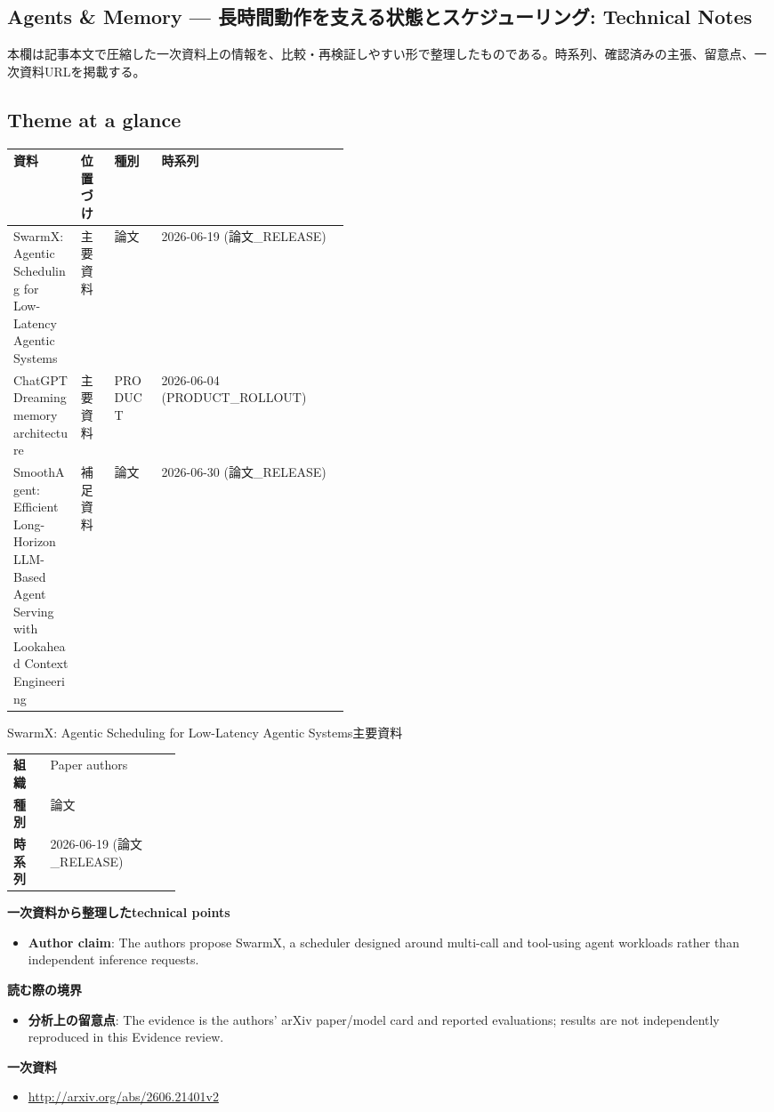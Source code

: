 \subsection*{Agents \& Memory — 長時間動作を支える状態とスケジューリング: Technical Notes}
本欄は記事本文で圧縮した一次資料上の情報を、比較・再検証しやすい形で整理したものである。時系列、確認済みの主張、留意点、一次資料URLを掲載する。
\medskip
\subsection*{Theme at a glance}
\begin{center}
\footnotesize
\begin{tabularx}{\linewidth}{@{}p{0.20\linewidth}p{0.10\linewidth}p{0.14\linewidth}X@{}}
\toprule
資料 & 位置づけ & 種別 & 時系列 \\
\midrule
SwarmX: Agentic Scheduling for Low-Latency Agentic Systems & 主要資料 & 論文 & 2026-06-19 (論文\_RELEASE) \\
ChatGPT Dreaming memory architecture & 主要資料 & PRODUCT & 2026-06-04 (PRODUCT\_ROLLOUT) \\
SmoothAgent: Efficient Long-Horizon LLM-Based Agent Serving with Lookahead Context Engineering & 補足資料 & 論文 & 2026-06-30 (論文\_RELEASE) \\
\bottomrule
\end{tabularx}
\end{center}
\normalsize

\begin{technicalnote}{SwarmX: Agentic Scheduling for Low-Latency Agentic Systems}{主要資料}
\begin{tabularx}{\linewidth}{@{}>{\bfseries}p{0.22\linewidth}X@{}}
組織 & Paper authors \\
種別 & 論文 \\
時系列 & 2026-06-19 (論文\_RELEASE) \\
\end{tabularx}
\smallskip
{\bfseries 一次資料から整理したtechnical points}
\begin{itemize}[leftmargin=1.5em,itemsep=0.35em]
\item \textbf{Author claim}: The authors propose SwarmX, a scheduler designed around multi-call and tool-using agent workloads rather than independent inference requests.
\end{itemize}
{\bfseries 読む際の境界}
\begin{itemize}[leftmargin=1.5em,itemsep=0.35em]
\item \textbf{分析上の留意点}: The evidence is the authors' arXiv paper/model card and reported evaluations; results are not independently reproduced in this Evidence review.
\end{itemize}
{\bfseries 一次資料}
\begingroup\sloppy
\begin{itemize}[leftmargin=1.5em,itemsep=0.25em]
\item {\scriptsize\url{http://arxiv.org/abs/2606.21401v2}}
\end{itemize}
\endgroup
\end{technicalnote}
\medskip

